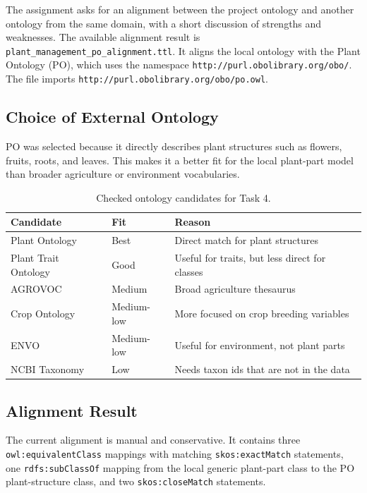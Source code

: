 \documentclass[11pt,a4paper]{article}
\newcommand{\artifact}[1]{\texttt{#1}}
\begin{document}
The assignment asks for an alignment between the project ontology and another
ontology from the same domain, with a short discussion of strengths and
weaknesses. The available alignment result is
\artifact{plant\_management\_po\_alignment.ttl}. It aligns the local ontology
with the Plant Ontology (PO), which uses the namespace
\artifact{http://purl.obolibrary.org/obo/}. The file imports
\artifact{http://purl.obolibrary.org/obo/po.owl}.

\subsection{Choice of External Ontology}

PO was selected because it directly describes plant structures such as flowers,
fruits, roots, and leaves. This makes it a better fit for the local plant-part
model than broader agriculture or environment vocabularies.

\begin{table}[h]
\centering
\begin{tabular}{lll}
\toprule
Candidate & Fit & Reason \\
\midrule
Plant Ontology & Best & Direct match for plant structures \\
Plant Trait Ontology & Good & Useful for traits, but less direct for classes \\
AGROVOC & Medium & Broad agriculture thesaurus \\
Crop Ontology & Medium-low & More focused on crop breeding variables \\
ENVO & Medium-low & Useful for environment, not plant parts \\
NCBI Taxonomy & Low & Needs taxon ids that are not in the data \\
\bottomrule
\end{tabular}
\caption{Checked ontology candidates for Task 4.}
\label{tab:alignment-candidates}
\end{table}

\subsection{Alignment Result}

The current alignment is manual and conservative. It contains three
\artifact{owl:equivalentClass} mappings with matching
\artifact{skos:exactMatch} statements, one \artifact{rdfs:subClassOf} mapping
from the local generic plant-part class to the PO plant-structure class, and two
\artifact{skos:closeMatch} statements.
\end{document}

